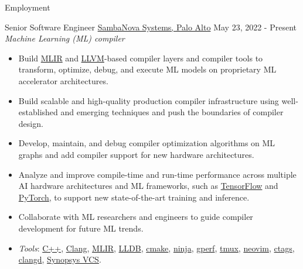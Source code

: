 \documentclass[]{mcdowellcv}
\begin{document}
    \makeheader

    \begin{cvsection}{Employment}
      \begin{cvsubsection}
        {Senior Software Engineer}
        {\href{https://sambanova.ai/}{SambaNova Systems, Palo Alto}}
        {May 23, 2022 - Present}
          \textit{Machine Learning (ML) compiler}
          \begin{itemize}
            \item
              Build \href{https://mlir.llvm.org/}{MLIR} and
              \href{https://llvm.org/}{LLVM}-based compiler layers and
              compiler tools to transform, optimize, debug, and execute ML
              models on proprietary ML accelerator architectures.
            \item
              Build scalable and high-quality production compiler
              infrastructure using well-established and emerging techniques
              and push the boundaries of compiler design.
            \item
              Develop, maintain, and debug compiler optimization algorithms
              on ML graphs and add compiler support for new hardware
              architectures.
            \item
              Analyze and improve compile-time and run-time performance
              across multiple AI hardware architectures and ML frameworks,
              such as \href{https://www.tensorflow.org/}{TensorFlow} and
              \href{https://pytorch.org/}{PyTorch}, to support new
              state-of-the-art training and inference.
            \item
              Collaborate with ML researchers and engineers to guide compiler
              development for future ML trends.
            \item
              \textit{Tools}: \href{https://isocpp.org/}{C++},
              \href{https://clang.llvm.org/}{Clang},
              \href{https://mlir.llvm.org/}{MLIR},
              \href{https://lldb.llvm.org/}{LLDB},
              \href{https://cmake.org/}{cmake},
              \href{https://ninja-build.org/}{ninja},
              \href{https://gperftools.github.io/gperftools/cpuprofile.html}{gperf},
              \href{https://github.com/tmux/tmux}{tmux},
              \href{https://neovim.io/}{neovim},
              \href{https://github.com/universal-ctags/ctags}{ctags},
              \href{https://clangd.llvm.org/}{clangd},
              \href{https://www.synopsys.com/verification/simulation/vcs.html}{Synopsys
              VCS}.
          \end{itemize}
      \end{cvsubsection}


\end{cvsection}
\end{document}
